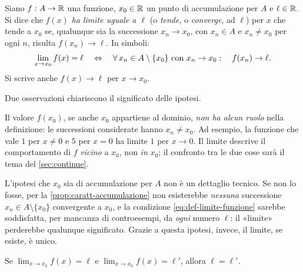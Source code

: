 \begin{definizione}\label{def:limite-funzione}
Siano $f:A\to\mathbb{R}$ una funzione, $x_{0}\in\mathbb{R}$ un punto di accumulazione per $A$ e
$\ell\in\mathbb{R}$. Si dice che $f(x)$ \emph{ha limite uguale a $\ell$} (o \emph{tende}, o
\emph{converge}, ad $\ell$) per $x$ che tende a $x_{0}$ se, qualunque sia la successione
$x_{n}\to x_{0}$, con $x_{n}\in A$ e $x_{n}\neq x_{0}$ per ogni $n$, risulta
$f(x_{n})\to\ell$. In simboli:
\begin{equation}\label{eq:def-limite-funzione}
  \lim_{x\to x_{0}}f(x)=\ell \quad\Leftrightarrow\quad
  \forall\, x_{n}\in A\setminus\{x_{0}\}\ \text{con}\ x_{n}\to x_{0}:\quad f(x_{n})\to\ell .
\end{equation}
Si scrive anche $f(x)\to\ell$ per $x\to x_{0}$.
\end{definizione}

Due osservazioni chiariscono il significato delle ipotesi.

\begin{osservazione}\label{oss:valore-irrilevante}
Il valore $f(x_{0})$, se anche $x_{0}$ appartiene al dominio, \emph{non ha alcun ruolo}
nella definizione: le successioni considerate hanno $x_{n}\neq x_{0}$. Ad esempio, la
funzione che vale $1$ per $x\neq0$ e $5$ per $x=0$ ha limite $1$ per $x\to0$. Il limite
descrive il comportamento di $f$ \emph{vicino} a $x_{0}$, non \emph{in} $x_{0}$; il
confronto tra le due cose sarà il tema del \cref{sec:continue}.
\end{osservazione}

\begin{osservazione}\label{oss:perche-accumulazione}
L'ipotesi che $x_{0}$ sia di accumulazione per $A$ non è un dettaglio tecnico. Se non lo
fosse, per la \cref{prop:caratt-accumulazione} non esisterebbe \emph{nessuna}
successione $x_{n}\in A\setminus\{x_{0}\}$ convergente a $x_{0}$, e la condizione
\eqref{eq:def-limite-funzione} sarebbe soddisfatta, per mancanza di controesempi, da
\emph{ogni} numero $\ell$: il «limite» perderebbe qualunque significato. Grazie a questa
ipotesi, invece, il limite, se esiste, è unico.
\end{osservazione}

\begin{proposizione}\label{prop:unicita-limite-funzioni}
Se $\displaystyle\lim_{x\to x_{0}}f(x)=\ell$ e $\displaystyle\lim_{x\to x_{0}}f(x)=\ell'$,
allora $\ell=\ell'$.
\end{proposizione}

